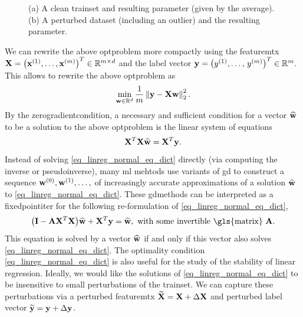 {{\begin{figure}[H]
{		(a) A clean \gls{trainset} and resulting \gls{parameter} (given by the average). 
		 (b) A perturbed \gls{dataset} (including an \gls{outlier}) 
		 and the resulting \gls{parameter}. \label{fig_linreg_dict}}
		 \end{figure}
		We can rewrite the above \gls{optproblem} more compactly using the 
		 \gls{featuremtx} ${\bf X} = \big({\bf x}^{(1)},\ldots,{\bf x}^{(m)}\big)^{T} \in \mathbb{R}^{m \times d}$ 
		and the \gls{label} \gls{vector} ${\bf y} = \big( y^{(1)},\ldots, \,y^{(m)} \big)^{T} \in \mathbb{R}^{m}$. 
		 This allows to rewrite the above \gls{optproblem} as
		 $$\min_{{\bf w} \in \mathbb{R}^{d}} \frac{1}{m} \left\Vert {{\bf y}- {\bf X}{\bf w}} \right\Vert_{2}^{2}.$$
		 By the \gls{zerogradientcondition}, a necessary and sufficient condition for a 
		 vector $\widehat{{\bf w}}$ to be a solution to the above \gls{optproblem} is the 
		 linear system of equations \cite{StrangLinAlg2016}
		 \begin{equation} 
			\label{eq_linreg_normal_eq_dict}
			{\bf X}^{T}{\bf X} \widehat{{\bf w}} = {\bf X}^{T} {\bf y}.
		 \end{equation}
		 Instead of solving \eqref{eq_linreg_normal_eq_dict} directly 
		 (via computing the \gls{inverse} or \gls{pseudoinverse}), 
		 many \gls{ml} mehtods use variants of \gls{gd} to construct a sequence 
		 ${\bf w}^{(0)},{\bf w}^{(1)},\ldots,$ of increasingly accurate approximations 
		 of a solution $\widehat{{\bf w}}$ to \eqref{eq_linreg_normal_eq_dict}. These 
		 \glspl{gdmethod} can be interpreted as a \gls{fixedpointiter} for the following 
		 re-formulation of \eqref{eq_linreg_normal_eq_dict}, 
		 $$ \big(\mathbf{I} - \mA \featuremtx^{T}\featuremtx\big) \widehat{\weights} + \featuremtx^{T} 
		 \labelvec = \widehat{\weights}, \mbox{ with some invertible \gls{matrix} } \mA.$$
		 This equation is solved by a \gls{vector} $\widehat{{\bf w}}$ if and only if 
		 this \gls{vector} also solves \eqref{eq_linreg_normal_eq_dict}. The optimality 
		  condition \eqref{eq_linreg_normal_eq_dict} is also useful for the study of 
		  the \gls{stability} of linear \gls{regression}. Ideally, we would like the solutions of 
		  \eqref{eq_linreg_normal_eq_dict} to be insensitive to small perturbations 
		  of the \gls{trainset}. We can capture these perturbations via a 
		  perturbed \gls{featuremtx} $\widetilde{{\bf X}} = {\bf X} + \Delta {\bf X}$
		  and perturbed \gls{label} 
		  \gls{vector} $\widetilde{{\bf y}} = {\bf y} + \Delta {\bf y}$. 
}}
